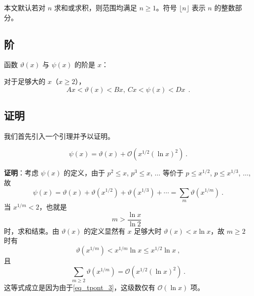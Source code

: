 
本文默认若对 $n$ 求和或求积，则范围均满足 $n \ge 1$。符号 $\lfloor n \rfloor$ 表示 $n$ 的整数部分。
\subsection{阶}
\begin{theorem}{}\label{the_tpont_1}
函数 $\vartheta(x)$ 与 $\psi(x)$ 的阶是 $x$：

对于足够大的 $x$（$x \ge 2$），
\begin{equation}
Ax < \vartheta(x) < Bx, ~ Cx < \psi(x) < Dx ~ ~.
\end{equation}

\end{theorem}

\subsection{证明}
我们首先引入一个引理并予以证明。
\begin{lemma}{}\label{lem_tpont_1}
\begin{equation}
\psi(x) = \vartheta(x) + \mathcal O\left( x^{1/2} (\ln x)^{2} \right) ~.
\end{equation}

\end{lemma}
\textbf{证明}：考虑 $\psi(x)$ 的定义，由于 $p^2 \le x$, $p^3 \le x$, $\dots$ 等价于 $p \le x^{1/2}$, $p \le x^{1/3}$, $\dots$, 故
\begin{equation}\label{eq_tpont_2}
\psi(x) = \vartheta(x) + \vartheta(x^{1/2}) + \vartheta(x^{1/3}) + \cdots = \sum_{m} \vartheta(x^{1/m}) ~.
\end{equation}
当 $x^{1/m} < 2$，也就是
\begin{equation}\label{eq_tpont_3}
m > \frac{\ln x}{\ln 2} ~~
\end{equation}
时，求和结束。由 $\vartheta(x)$ 的定义显然有 $x$ 足够大时 $\vartheta(x) < x \ln x$，故 $m \ge 2$ 时有
\begin{equation}
\vartheta(x^{1/m}) < x^{1/m} \ln x \le x^{1/2} \ln x~,
\end{equation}
且
\begin{equation}\label{eq_tpont_1}
\sum_{m \ge 2} \vartheta(x^{1/m}) = \mathcal O\left( x^{1/2} (\ln x)^{2} \right) ~.
\end{equation}
这等式成立是因为由于\autoref{eq_tpont_3}，这级数仅有 $\mathcal O(\ln x)$ 项。

